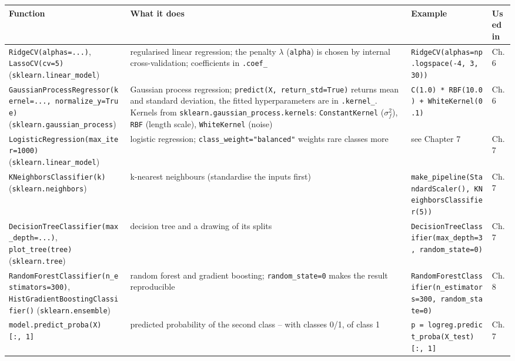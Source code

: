 \documentclass[
  letterpaper,
  DIV=11,
  numbers=noendperiod]{scrreprt}
\begin{document}
\begin{longtable}[]{@{}
  >{\raggedright\arraybackslash}p{}
  >{\raggedright\arraybackslash}p{}
  >{\raggedright\arraybackslash}p{}
  >{\raggedright\arraybackslash}p{}@{}}
\toprule\noalign{}
\begin{minipage}[b]{\linewidth}\raggedright
Function
\end{minipage} & \begin{minipage}[b]{\linewidth}\raggedright
What it does
\end{minipage} & \begin{minipage}[b]{\linewidth}\raggedright
Example
\end{minipage} & \begin{minipage}[b]{\linewidth}\raggedright
Used in
\end{minipage} \\
\midrule\noalign{}
\endhead
\bottomrule\noalign{}
\endlastfoot
\texttt{RidgeCV(alphas=...)}, \texttt{LassoCV(cv=5)}
(\texttt{sklearn.linear\_model}) & regularised linear regression; the
penalty \(\lambda\) (\texttt{alpha}) is chosen by internal
cross-validation; coefficients in \texttt{.coef\_} &
\texttt{RidgeCV(alphas=np.logspace(-4,\ 3,\ 30))} & Ch. 6 \\
\texttt{GaussianProcessRegressor(kernel=...,\ normalize\_y=True)}
(\texttt{sklearn.gaussian\_process}) & Gaussian process regression;
\texttt{predict(X,\ return\_std=True)} returns mean and standard
deviation, the fitted hyperparameters are in \texttt{.kernel\_}. Kernels
from \texttt{sklearn.gaussian\_process.kernels}: \texttt{ConstantKernel}
(\(\sigma_f^2\)), \texttt{RBF} (length scale), \texttt{WhiteKernel}
(noise) & \texttt{C(1.0)\ *\ RBF(10.0)\ +\ WhiteKernel(0.1)} & Ch. 6 \\
\texttt{LogisticRegression(max\_iter=1000)}
(\texttt{sklearn.linear\_model}) & logistic regression;
\texttt{class\_weight="balanced"} weights rare classes more & see
Chapter 7 & Ch. 7 \\
\texttt{KNeighborsClassifier(k)} (\texttt{sklearn.neighbors}) &
k-nearest neighbours (standardise the inputs first) &
\texttt{make\_pipeline(StandardScaler(),\ KNeighborsClassifier(5))} &
Ch. 7 \\
\texttt{DecisionTreeClassifier(max\_depth=...)},
\texttt{plot\_tree(tree)} (\texttt{sklearn.tree}) & decision tree and a
drawing of its splits &
\texttt{DecisionTreeClassifier(max\_depth=3,\ random\_state=0)} & Ch.
7 \\
\texttt{RandomForestClassifier(n\_estimators=300)},
\texttt{HistGradientBoostingClassifier()} (\texttt{sklearn.ensemble}) &
random forest and gradient boosting; \texttt{random\_state=0} makes the
result reproducible &
\texttt{RandomForestClassifier(n\_estimators=300,\ random\_state=0)} &
Ch. 8 \\
\texttt{model.predict\_proba(X){[}:,\ 1{]}} & predicted probability of
the second class -- with classes 0/1, of class 1 &
\texttt{p\ =\ logreg.predict\_proba(X\_test){[}:,\ 1{]}} & Ch. 7 \\
\end{longtable}
\end{document}
